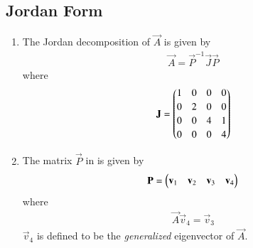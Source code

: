 \subsection{Jordan Form}
\renewcommand{\theequation}{\theenumi}
\renewcommand{\thefigure}{\theenumi}
\begin{enumerate}[label=\thesection.\arabic*.,ref=\thesection.\theenumi]

\item The Jordan decomposition of $\vec{A}$ is given by
\begin{align}
\vec{A} = \vec{P}^{-1}\vec{J}\vec{P}
\label{eq:jord_mat}
\end{align}
%
where
%
\begin{align}
\mathbf{J} = 
\begin{pmatrix}
  1 &  0 &  0 &  0 \\[2pt]
  0 &  2 & 0 & 0 \\[2pt]
 0 & 0 &  4 &  1 \\[2pt]
  0 &  0 & 0 &  4
\end{pmatrix}
\label{eq:diag_exam_jord_mat}
\end{align}
\item The matrix $\vec{P}$ in \label{eq:exam_jord_mat} is given by 
\begin{align}
\mathbf{P} = \begin{pmatrix}\mathbf{v}_1 & \mathbf{v}_2 & \mathbf{v}_3 & \mathbf{v}_4 \end{pmatrix}
\end{align}
%
where 
\begin{align}
\vec{A}\vec{v}_4 = \vec{v}_3   
\end{align}
$\vec{v}_4$ is defined to be the {\em generalized} eigenvector of $\vec{A}$.
\end{enumerate}

